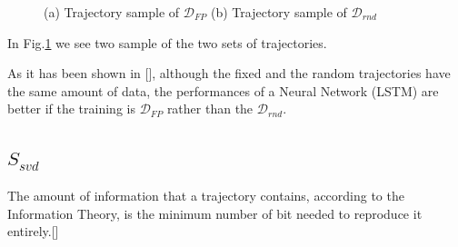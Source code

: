 \documentclass{article}
\begin{document}
\begin{figure}[]
    \centering 
    \caption{(a)  Trajectory sample of $\mathcal{D}_{FP}$ (b) Trajectory sample of $\mathcal{D}_{rnd}$ }
    \label{fig:plot_traj}
\end{figure}
In Fig.\ref{fig:plot_traj} we see two sample of the two sets of trajectories.

As it has been shown in [\citeyear{bucci2021leveraging}], although the fixed and the random trajectories have the same amount of data, the performances of a Neural Network (LSTM) are better if the training is $\mathcal{D}_{FP}$ rather than the $\mathcal{D}_{rnd}$. 
\subsection{$S_{svd}$}
The amount of information that a trajectory contains, according to the Information Theory, is the minimum number of bit needed to reproduce it entirely.[\citeyear{shannonEntropy}]
\end{document}
